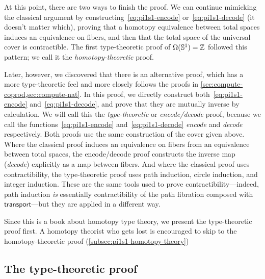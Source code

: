At this point, there are two ways to finish the proof.
We can continue mimicking the classical argument by constructing~\eqref{eq:pi1s1-encode} or~\eqref{eq:pi1s1-decode} (it doesn't matter which), proving that a homotopy equivalence between total spaces induces an equivalence on fibers, and then that the total space of the universal cover is contractible.
The first type-theoretic proof of $\Omega(\mathbb{S}^1)=\mathbb{Z}$ followed this pattern; we call it the \emph{homotopy-theoretic} proof.

Later, however, we discovered that there is an alternative proof, which has a more type-theoretic feel and more closely follows the proofs in \autoref{sec:compute-coprod,sec:compute-nat}.
In this proof, we directly construct both~\eqref{eq:pi1s1-encode} and~\eqref{eq:pi1s1-decode}, and prove that they are mutually inverse by calculation.
We will call this the \emph{type-theoretic} or \emph{encode/decode} proof, because we call the functions~\eqref{eq:pi1s1-encode} and~\eqref{eq:pi1s1-decode} \emph{encode} and \emph{decode} respectively.
Both proofs use the same construction of the cover given above.
Where the classical proof induces an equivalence on fibers from an equivalence between total spaces, the encode/decode proof constructs the inverse map (\emph{decode}) explicitly as a map between fibers.
And where the classical proof uses contractibility, the type-theoretic proof uses path induction, circle induction, and integer induction.
These are the same tools used to prove contractibility---indeed, path induction \emph{is} essentially contractibility of the path fibration composed with $\mathsf{transport}$---but they are applied in a different way.

Since this is a book about homotopy type theory, we present the type-theoretic proof first.
A homotopy theorist who gets lost is encouraged to skip to the homotopy-theoretic proof (\autoref{subsec:pi1s1-homotopy-theory})

\subsection{The type-theoretic proof}
\label{subsec:pi1s1-encode-decode}

